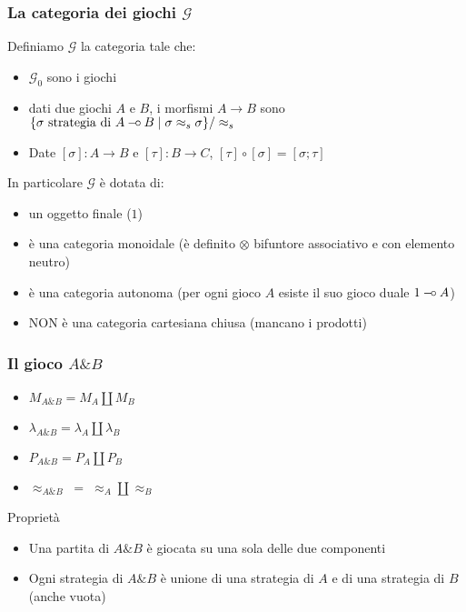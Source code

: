 \documentclass{beamer}
\newcommand{\limp}{\mathbin{{-}\mkern-3.5mu{\circ}}}
\begin{document}
\begin{frame}
 	
 	\frametitle{La categoria dei giochi $\mathcal{G}$}
 	
 	Definiamo $\mathcal{G}$ la categoria tale che:
 	\begin{itemize}
 		\item $\mathcal{G}_0$ sono i giochi
 		\item dati due giochi $A$ e $B$, i morfismi $A\rightarrow B$ sono $\{ \sigma \text{ strategia di } A\limp B \;|\; \sigma \approx_s \sigma \} / \approx_s$
 		\item Date $[\sigma] : A\rightarrow B$ e $[\tau] : B \rightarrow C$, $[\tau] \circ [\sigma] = [\sigma ; \tau]$
 	\end{itemize}
 	
 	In particolare $\mathcal{G}$ è dotata di:
 	\begin{itemize}
 		\item un oggetto finale ($1$)
 		\item è una categoria monoidale (è definito $\otimes$ bifuntore associativo e con elemento neutro)
 		\item è una categoria autonoma (per ogni gioco $A$ esiste il suo gioco duale $1 \limp A$)
 		\item NON è una categoria cartesiana chiusa (mancano i prodotti)
 	\end{itemize}
 	
 \end{frame}

\begin{frame}
	
	\frametitle{Il gioco $A \& B$}
	
	\begin{itemize}
		\item $M_{A\& B}=M_A \coprod M_B$
		\item $\lambda_{A\& B}=\lambda_A \coprod \lambda_B$
		\item $P_{A\& B}=P_A \coprod P_B$
		\item $\approx_{A\& B} \; = \; \approx_A \coprod \approx_B$ 
	\end{itemize}
	
	\begin{block}{Proprietà}
		\begin{itemize}
			\item Una partita di $A\& B$ è giocata su una sola delle due componenti
			\item Ogni strategia di $A\& B$ è unione di una strategia di $A$ e di una strategia di $B$ (anche vuota)
		\end{itemize}
		
	\end{block}
	
\end{frame}
\end{document}
